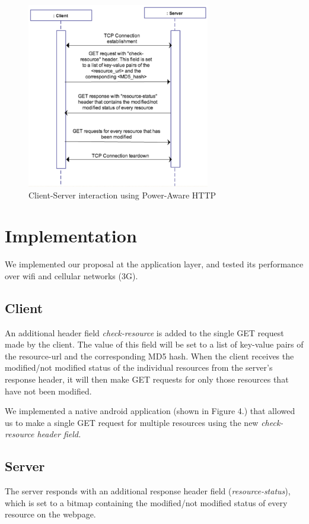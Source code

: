 \documentclass{sigplanconf}
\begin{document}
\begin{figure}[ht!]
\centering
\includegraphics[width=80mm]{proposal}
\caption{Client-Server interaction using Power-Aware HTTP }
\label{fig:sp_gd_mnist}
\end{figure}

\section{Implementation}

We implemented our proposal at the application layer, and tested its performance over wifi and cellular networks (3G).

\subsection{Client}

An additional header field {\it check-resource} is added to the single GET request made by the client. The value of this field will be set to a list of key-value pairs of the resource-url and the corresponding MD5 hash. When the client receives the modified/not modified status of the individual resources from the server's response header, it will then make GET requests for only those resources that have not been modified.

We implemented a native android application (shown in Figure 4.) that allowed us to make a single GET request for multiple resources using the new \it{check-resource} \rm header field.


\subsection{Server}

The server responds with an additional response header field ({\it resource-status}),  which is set to a bitmap containing the modified/not modified status of every resource on the webpage. 
\end{document}
